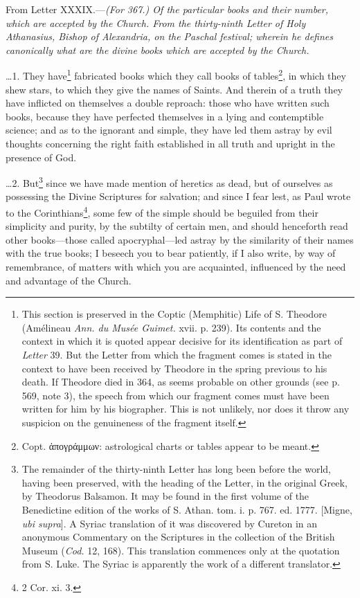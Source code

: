 
From Letter XXXIX.—\emph{(For 367.) Of the particular books and their number, which are accepted by the Church. From the thirty-ninth Letter of Holy Athanasius, Bishop of Alexandria, on the Paschal festival; wherein he defines canonically what are the divine books which are accepted by the Church.}

…1. They have\footnote{This section is preserved in the Coptic (Memphitic) Life of S. Theodore (Amélineau \emph{Ann. du Musée Guimet.} xvii. p. 239). Its contents and the context in which it is quoted appear decisive for its identification as part of \emph{Letter} 39. But the Letter from which the fragment comes is stated in the context to have been received by Theodore in the spring previous to his death. If Theodore died in 364, as seems probable on other grounds (see p. 569, note 3), the speech from which our fragment comes must have been written for him by his biographer. This is not unlikely, nor does it throw any suspicion on the genuineness of the fragment itself.} fabricated books which they call books of tables\footnote{Copt. \textgreek{ἀπογράμμων}: astrological charts or tables appear to be meant.}, in which they shew stars, to which they give the names of Saints. And therein of a truth they have inflicted on themselves a double reproach: those who have written such books, because they have perfected themselves in a lying and contemptible science; and as to the ignorant and simple, they have led them astray by evil thoughts concerning the right faith established in all truth and upright in the presence of God.

…2. But\footnote{The remainder of the thirty-ninth Letter has long been before the world, having been preserved, with the heading of the Letter, in the original Greek, by Theodorus Balsamon. It may be found in the first volume of the Benedictine edition of the works of S. Athan. tom. i. p. 767. ed. 1777. [Migne, \emph{ubi supra}]. A Syriac translation of it was discovered by Cureton in an anonymous Commentary on the Scriptures in the collection of the British Museum (\emph{Cod.} 12, 168). This translation commences only at the quotation from S. Luke. The Syriac is apparently the work of a different translator.} since we have made mention of heretics as dead, but of ourselves as possessing the Divine Scriptures for salvation; and since I fear lest, as Paul wrote to the Corinthians\footnote{2 Cor. xi. 3.}, some few of the simple should be beguiled from their simplicity and purity, by the subtilty of certain men, and should henceforth read other books—those called apocryphal—led astray by the similarity of their names with the true books; I beseech you to bear patiently, if I also write, by way of remembrance, of matters with which you are acquainted, influenced by the need and advantage of the Church.


